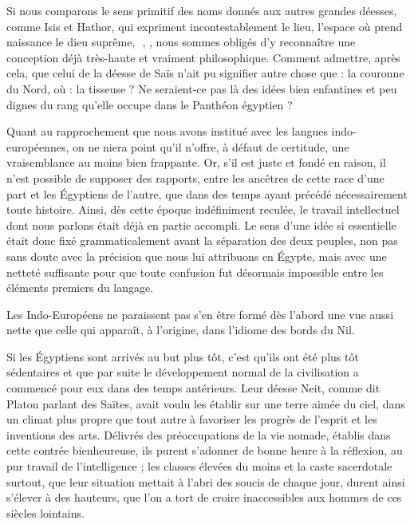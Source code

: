 \documentclass[letterpaper,twocolumn,openany,nodeprecatedcode]{dndbook}
\newcommand*\hieroAACB{\raisebox{0.5ex}{}}
\newcommand*\hieroAAHY{}
\newcommand*\hieroAARM{}
\begin{document}
Si nous comparons le sens primitif des noms donnés aux autres grandes déesses, comme Isis et Hathor, qui expriment incontestablement le lieu, l'espace où prend naissance le dieu suprême, $\hieroAAHY\:\hieroAACB$, $\hieroAARM$, nous sommes obligés d'y reconnaître une conception déjà très-haute et vraiment philosophique. Comment admettre, après cela, que celui de la déesse de Saïs n'ait pu signifier autre chose que : la couronne du Nord, où : la tisseuse ? Ne seraient-ce pas là des idées bien enfantines et peu dignes du rang qu'elle occupe dans le Panthéon égyptien ?

Quant au rapprochement que nous avons institué avec les langues indo-européennes, on ne niera point qu'il n'offre, à défaut de certitude, une vraisemblance au moins bien frappante. Or, s'il est juste et fondé en raison, il n'est possible de supposer des rapports, entre les ancêtres de cette race d'une part et les Égyptiens de l'autre, que dans des temps ayant précédé nécessairement toute histoire. Ainsi, dès cette époque indéfiniment reculée, le travail intellectuel dont nous parlons était déjà en partie accompli. Le sens d'une idée si essentielle était donc fixé grammaticalement avant la séparation des deux peuples, non pas sans doute avec la précision que nous lui attribuons en Égypte, mais avec une netteté suffisante pour que toute confusion fut désormais impossible entre les éléments premiers du langage.

Les Indo-Européens ne paraissent pas s'en être formé dès l'abord une vue aussi nette que celle qui apparaît, à l'origine, dans l'idiome des bords du Nil.

Si les Égyptiens sont arrivés au but plus tôt, c'est qu'ils ont été plus tôt sédentaires et que par suite le développement normal de la civilisation a commencé pour eux dans des temps antérieurs. Leur déesse Neit, comme dit Platon parlant des Saïtes, avait voulu les établir sur une terre aimée du ciel, dans un climat plus propre que tout autre à favoriser les progrès de l'esprit et les inventions des arts. Délivrés des préoccupations de la vie nomade, établis dans cette contrée bienheureuse, ils purent s'adonner de bonne heure à la réflexion, au pur travail de l'intelligence ; les classes élevées du moins et la caste sacerdotale surtout, que leur situation mettait à l'abri des soucis de chaque jour, durent ainsi s'élever à des hauteurs, que l'on a tort de croire inaccessibles aux hommes de ces siècles lointains.
\end{document}
